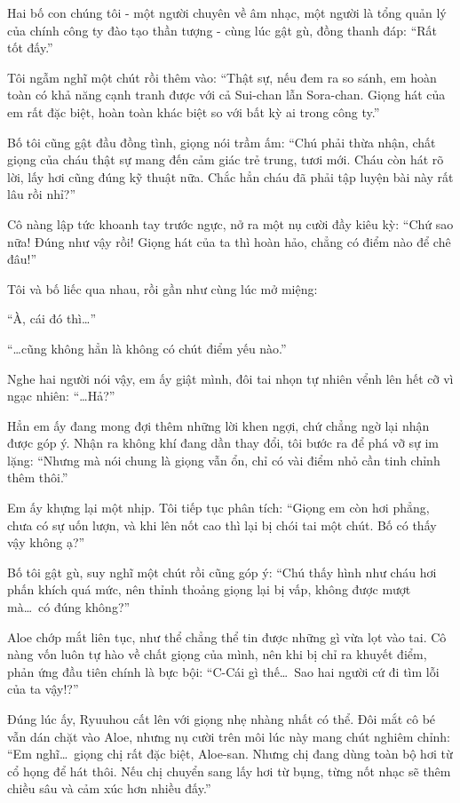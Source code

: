 \documentclass[../main.tex]{subfiles}
\begin{document}
Hai bố con chúng tôi - một người chuyên về âm nhạc, một người là tổng quản lý của chính công ty đào tạo thần tượng - cùng lúc gật gù, đồng thanh đáp: ``Rất tốt đấy.''

Tôi ngẫm nghĩ một chút rồi thêm vào: ``Thật sự, nếu đem ra so sánh, em hoàn toàn có khả năng cạnh tranh được với cả Sui-chan lẫn Sora-chan. Giọng hát của em rất đặc biệt, hoàn toàn khác biệt so với bất kỳ ai trong công ty.''

Bố tôi cũng gật đầu đồng tình, giọng nói trầm ấm: ``Chú phải thừa nhận, chất giọng của cháu thật sự mang đến cảm giác trẻ trung, tươi mới. Cháu còn hát rõ lời, lấy hơi cũng đúng kỹ thuật nữa. Chắc hẳn cháu đã phải tập luyện bài này rất lâu rồi nhỉ?''

Cô nàng lập tức khoanh tay trước ngực, nở ra một nụ cười đầy kiêu kỳ: ``Chứ sao nữa! Đúng như vậy rồi! Giọng hát của ta thì hoàn hảo, chẳng có điểm nào để chê đâu!''

Tôi và bố liếc qua nhau, rồi gần như cùng lúc mở miệng:

``À, cái đó thì\dots''

``\dots cũng không hẳn là không có chút điểm yếu nào.''

Nghe hai người nói vậy, em ấy giật mình, đôi tai nhọn tự nhiên vểnh lên hết cỡ vì ngạc nhiên: ``\dots Hả?''

Hẳn em ấy đang mong đợi thêm những lời khen ngợi, chứ chẳng ngờ lại nhận được góp ý. Nhận ra không khí đang dần thay đổi, tôi bước ra để phá vỡ sự im lặng: ``Nhưng mà nói chung là giọng vẫn ổn, chỉ có vài điểm nhỏ cần tinh chỉnh thêm thôi.''

Em ấy khựng lại một nhịp. Tôi tiếp tục phân tích: ``Giọng em còn hơi phẳng, chưa có sự uốn lượn, và khi lên nốt cao thì lại bị chói tai một chút. Bố có thấy vậy không ạ?''

Bố tôi gật gù, suy nghĩ một chút rồi cũng góp ý: ``Chú thấy hình như cháu hơi phấn khích quá mức, nên thỉnh thoảng giọng lại bị vấp, không được mượt mà\dots\ có đúng không?''

Aloe chớp mắt liên tục, như thể chẳng thể tin được những gì vừa lọt vào tai. Cô nàng vốn luôn tự hào về chất giọng của mình, nên khi bị chỉ ra khuyết điểm, phản ứng đầu tiên chính là bực bội: ``C-Cái gì thế\dots\ Sao hai người cứ đi tìm lỗi của ta vậy!?''

Đúng lúc ấy, Ryuuhou cất lên với giọng nhẹ nhàng nhất có thể. Đôi mắt cô bé vẫn dán chặt vào Aloe, nhưng nụ cười trên môi lúc này mang chút nghiêm chỉnh: ``Em nghĩ\dots\ giọng chị rất đặc biệt, Aloe-san. Nhưng chị đang dùng toàn bộ hơi từ cổ họng để hát thôi. Nếu chị chuyển sang lấy hơi từ bụng, từng nốt nhạc sẽ thêm chiều sâu và cảm xúc hơn nhiều đấy.''
\end{document}
